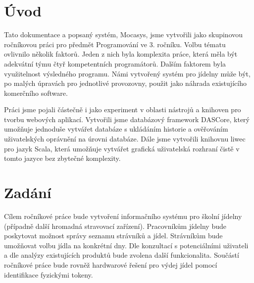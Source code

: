 \chapter*{Úvod}

Tato dokumentace a popsaný systém, Mocasys, jsme vytvořili jako skupinovou
ročníkovou práci pro předmět Programování ve 3. ročníku. Volbu tématu ovlivnilo
několik faktorů. Jeden z nich byla komplexita práce, která měla být adekvátní
týmu čtyř kompetentních programátorů. Dalším faktorem byla využitelnost
výsledného programu. Námi vytvořený systém pro jídelny může být, po malých
úpravách pro jednotlivé provozovny, použit jako náhrada existujícího komerčního
software.

Práci jsme pojali částečně i jako experiment v oblasti nástrojů a knihoven pro
tvorbu webových aplikací. Vytvořili jsme databázový framework DASCore, který
umožňuje jednoduše vytvářet databáze s ukládáním historie a ověřováním
uživatelských oprávnění na úrovni databáze. Dále jsme vytvořili knihovnu liwec
pro jazyk Scala, která umožňuje vytvářet grafická uživatelská rozhraní čistě v
tomto jazyce bez zbytečné komplexity.

\chapter*{Zadání}

Cílem ročníkové práce bude vytvoření informačního systému pro školní jídelny (případně další hromadná stravovací zařízení).
Pracovníkům jídelny bude poskytovat možnost správy seznamu strávníků a jídel.
Strávníkům bude umožňovat volbu jídla na konkrétní dny.
Dle konzultací s potenciálními uživateli a dle analýzy existujících produktů bude zvolena další funkcionalita.
Součástí ročníkové práce bude rovněž hardwarové řešení pro výdej jídel pomocí identifikace fyzickými tokeny.
